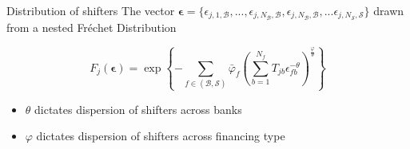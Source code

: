\documentclass[english,xcolor=svgnames]{beamer}
\begin{document}
\begin{frame}{Distribution of shifters}
The vector $\bm{\epsilon} = \{\epsilon_{j,1,\mathcal{B}}, ... , \epsilon_{j,N_{\mathcal{B}},\mathcal{B}},\epsilon_{j,N_{\mathcal{B}},\mathcal{B}},...  \epsilon_{j,N_{\mathcal{S}},\mathcal{S}} \}$ drawn from a nested Fr\'echet Distribution

$$F_j(\bm{\epsilon}) = \exp{\left\lbrace- \sum_{f \in (\mathcal{B},\mathcal{S})} \bar{\varphi}_f \left( \sum_{b = 1}^{N_{f}}  T_{jb} \epsilon_{fb}^{-\theta} \right)^{\frac{\varphi}{\theta}} \right\rbrace}$$
\begin{itemize}
\item $\theta$ dictates dispersion of shifters across banks
\item $\varphi$ dictates dispersion of shifters across financing type
\end{itemize}
\end{frame}
%
\end{document}
